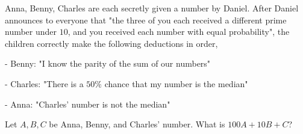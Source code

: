 Anna, Benny, Charles are each secretly given a number by Daniel. After Daniel announces to everyone that "the three of you each received a different prime number under $10$, and you received each number with equal probability", the children correctly make the following deductions in order,

- Benny: "I know the parity of the sum of our numbers"

- Charles: "There is a $50\%$ chance that my number is the median"

- Anna: "Charles' number is not the median"

Let $A,B,C$ be Anna, Benny, and Charles' number. What is $100A+10B+C$?
